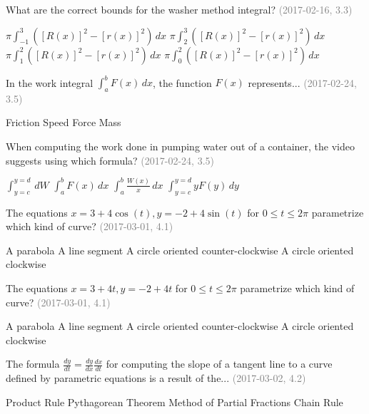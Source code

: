 \documentclass[12pt]{exam}
\newcommand{\questionDate}[1]{\textcolor{gray}{(#1)}}
\newcommand{\<}{\langle}
\renewcommand{\>}{\rangle}
\begin{document}
\begin{questions}
  \question
   What are the correct bounds for the washer method integral?
  \questionDate{2017-02-16, 3.3}
  \begin{choices}
    \choice
      \(\pi\int_{-1}^3([R(x)]^2-[r(x)]^2)\,dx\)
    \choice
      \(\pi\int_2^3([R(x)]^2-[r(x)]^2)\,dx\)
    \CorrectChoice
      \(\pi\int_1^2([R(x)]^2-[r(x)]^2)\,dx\)
    \choice
      \(\pi\int_0^2([R(x)]^2-[r(x)]^2)\,dx\)
  \end{choices}

\newpage

  \question
  In the work integral \(\int_a^b F(x)\,dx\), the function \(F(x)\)
  represents...
  \questionDate{2017-02-24, 3.5}
  \begin{choices}
    \choice
      Friction
    \choice
      Speed
    \CorrectChoice
      Force
    \choice
      Mass
  \end{choices}

  \question
  When computing the work done in pumping water out of a container,
  the video suggests using which formula?
  \questionDate{2017-02-24, 3.5}
  \begin{choices}
    \CorrectChoice
      \(\int_{y=c}^{y=d}\,dW\)
    \choice
      \(\int_a^b F(x)\,dx\)
    \choice
      \(\int_a^b \frac{W(x)}{x}\,dx\)
    \choice
      \(\int_{y=c}^{y=d}yF(y)\,dy\)
  \end{choices}

\newpage

  \question
  The equations \(x=3+4\cos(t),y=-2+4\sin(t)\) for \(0\leq t\leq 2\pi\)
  parametrize which kind of curve?
  \questionDate{2017-03-01, 4.1}
  \begin{choices}
    \choice
      A parabola
    \choice
      A line segment
    \CorrectChoice
      A circle oriented counter-clockwise
    \choice
      A circle oriented clockwise
  \end{choices}

  \question
  The equations \(x=3+4t,y=-2+4t\) for \(0\leq t\leq 2\pi\)
  parametrize which kind of curve?
  \questionDate{2017-03-01, 4.1}
  \begin{choices}
    \choice
      A parabola
    \CorrectChoice
      A line segment
    \choice
      A circle oriented counter-clockwise
    \choice
      A circle oriented clockwise
  \end{choices}

\newpage

  \question
  The formula \(\frac{dy}{dt}=\frac{dy}{dx}\frac{dx}{dt}\) for computing the
  slope of a tangent line to a curve defined by parametric equations is
  a result of the...
  \questionDate{2017-03-02, 4.2}
  \begin{choices}
    \choice
      Product Rule
    \choice
      Pythagorean Theorem
    \choice
      Method of Partial Fractions
    \CorrectChoice
      Chain Rule
  \end{choices}


\end{questions}
\end{document}
